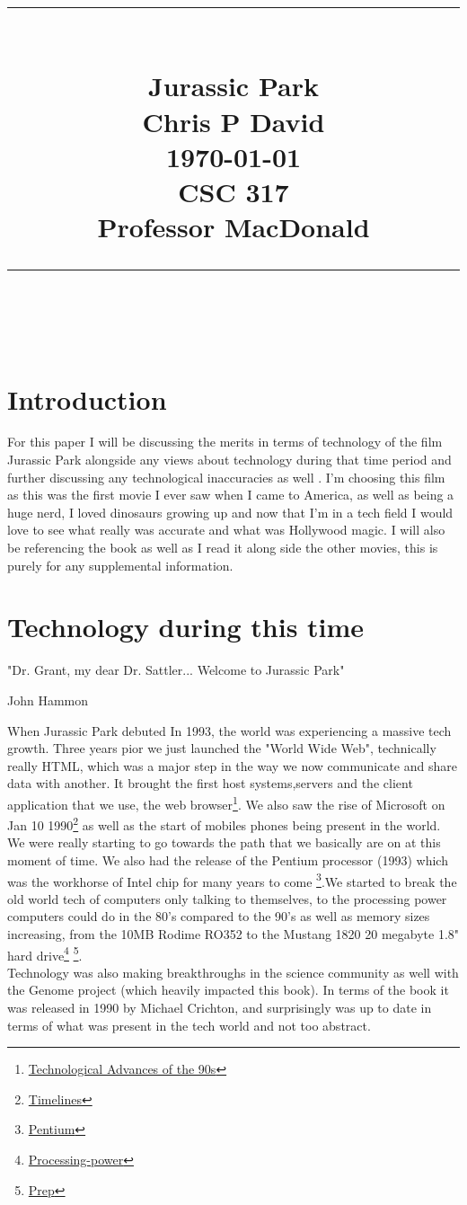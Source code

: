 \documentclass[12ptletterpaper]{paper}
\title{
	\begin{center}
		\normalfont \normalsize
		\rule{\linewidth}{.5pt} \\[0.4cm] 
		\huge {Jurassic Park} \\ 
		\small{Chris P David}\\
		{\today}\\
		{CSC 317}\\
		{Professor MacDonald}
		\rule{\linewidth}{.5pt} \\
	\end{center}
}
\newcommand\tab[1][1cm]{\hspace*{#1}}
\begin{document}
	\begin{titlepage}
		\clearpage
		\maketitle
		\thispagestyle{empty}
	\end{titlepage}
	\pagebreak	
	\tableofcontents
	\begin{flushleft}
		\pagebreak
		\section{Introduction}
		\tab For this paper I will be discussing the merits in terms of technology of the film Jurassic Park alongside any views about technology during that time period and further discussing any technological inaccuracies as well . I'm choosing this film as this was the first movie I ever saw when I came to America, as well as being a huge nerd, I loved dinosaurs growing up and now that I'm in a tech field I would love to see what really was accurate and what was Hollywood magic. I will also be referencing the book as well as I read it along side the other movies, this is purely for any supplemental information.
		
		\section{Technology during this time}
		\epigraph{"Dr. Grant, my dear Dr. Sattler... Welcome to Jurassic Park"}{John Hammon}
		\tab When Jurassic Park debuted In 1993, the world was experiencing a massive tech growth. Three years pior we just launched the "World Wide Web", technically really HTML, which was a major step in the way we now communicate and share data with another. It brought the first host systems,servers and the client application that we use, the web browser\footnote[1]{\hyperlink{Technological Advances of the 90s}{Technological Advances of the 90s}}. We also saw the rise of Microsoft on Jan 10 1990\footnote[2]{\hyperlink{Timelines}{Timelines}} as well as the start of mobiles phones being present in the world. We were really starting to go towards the path that we basically are on at this moment of time. We also had the release of the Pentium processor (1993) which was the workhorse of Intel chip for many years to come \footnote[3]{\hyperlink{Pentium}{Pentium}}.We started to break the old world tech of computers only talking to themselves, to the processing power computers could do in the 80's compared to the 90's as well as memory sizes increasing, from the 10MB Rodime RO352 to the Mustang 1820 20 megabyte 1.8" hard drive\footnote[4]{\hyperlink{Processing-power}{Processing-power}}  \footnote[5]{\hyperlink{Prep}{Prep}}. \\
		\tab Technology was also making breakthroughs in the science community as well with the Genome project (which heavily impacted this book). In terms of the book it was released in 1990 by Michael Crichton, and surprisingly was up to date in terms of what was present in the tech world and not too abstract. 
		

\end{flushleft}
\end{document}
